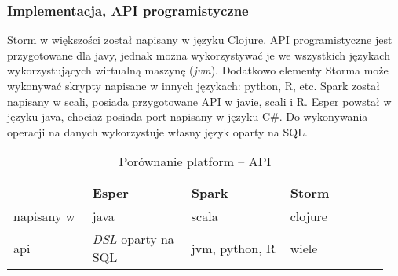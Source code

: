 \subsubsection*{Implementacja, API programistyczne}
Storm w większości został napisany w języku Clojure.
API programistyczne jest przygotowane dla javy,
jednak można wykorzystywać je we wszystkich językach wykorzystujących wirtualną maszynę (\textit{jvm}).
Dodatkowo elementy Storma może wykonywać skrypty napisane w innych językach: python, R, etc.
Spark został napisany w scali,
posiada przygotowane API w javie, scali i R.
Esper powstał w języku java, chociaż posiada port napisany w języku C\#.
Do wykonywania operacji na danych wykorzystuje własny język oparty na SQL.
\begin{table}[h]
  \label{tab:ProgrammingApi}
  \begin{tabular}{p{0.2\linewidth} | p{0.25\linewidth} | p{0.25\linewidth} | p{0.25\linewidth}}
    & Esper & Spark & Storm \\
    \hline
    napisany w & java & scala & clojure \\
    \hline
    api & \textit{DSL} oparty na SQL & jvm, python, R & wiele \\
  \end{tabular}
  \caption{Porównanie platform -- API}
\end{table}
